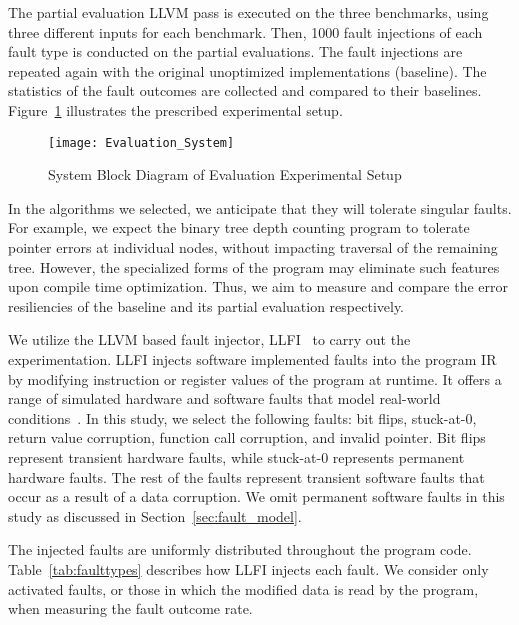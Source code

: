 The partial evaluation LLVM pass is executed on the three benchmarks, using three different inputs for each benchmark.
Then, 1000 fault injections of each fault type is conducted on the partial evaluations.
The fault injections are repeated again with the original unoptimized implementations (baseline).
The statistics of the fault outcomes are collected and compared to their baselines. 
Figure~\ref{fig:evaluation_sys} illustrates the prescribed experimental setup.

\begin{figure}[htbp]
  \centering
  \texttt{[image: Evaluation\_System]}
  \caption{System Block Diagram of Evaluation Experimental Setup}
  \label{fig:evaluation_sys}
\end{figure}

In the algorithms we selected, we anticipate that they will tolerate singular faults.
For example, we expect the binary tree depth counting program to tolerate pointer errors at individual nodes, without impacting traversal of the remaining tree.
However, the specialized forms of the program may eliminate such features upon compile time optimization.
Thus, we aim to measure and compare the error resiliencies of the baseline and its partial evaluation respectively.

We utilize the LLVM based fault injector, LLFI~\cite{LLFI} to carry out the experimentation.
LLFI injects software implemented faults into the program IR by modifying instruction or register values of the program at runtime.
It offers a range of simulated hardware and software faults that model real-world conditions~\cite{V2005}.
In this study, we select the following faults: bit flips, stuck-at-0, return value corruption, function call corruption, and invalid pointer.
Bit flips represent transient hardware faults, while stuck-at-0 represents permanent hardware faults. 
The rest of the faults represent transient software faults that occur as a result of a data corruption.
We omit permanent software faults in this study as discussed in Section~\ref{sec:fault_model}.

The injected faults are uniformly distributed throughout the program code.
Table~\ref{tab:faulttypes} describes how LLFI injects each fault.
We consider only activated faults, or those in which the modified data is read by the program, when measuring the fault outcome rate.


